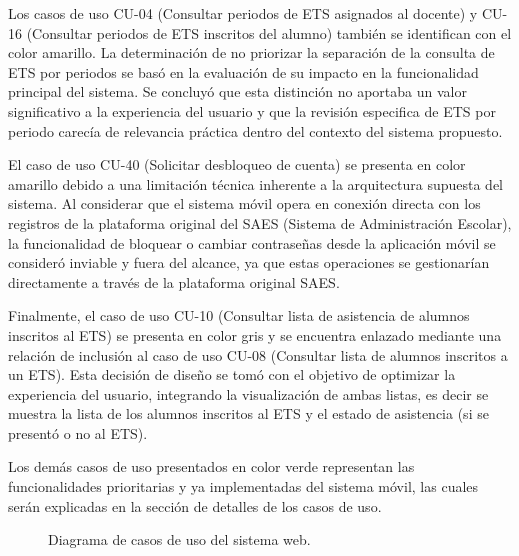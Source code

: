 Los casos de uso CU-04 (Consultar periodos de ETS asignados al docente) y CU-16 (Consultar periodos de ETS inscritos del alumno) también se identifican con el color amarillo. La determinación de no priorizar la separación de la consulta de ETS por periodos se basó en la evaluación de su impacto en la funcionalidad principal del sistema. Se concluyó que esta distinción no aportaba un valor significativo a la experiencia del usuario y que la revisión especifica de ETS por periodo carecía de relevancia práctica dentro del contexto del sistema propuesto.


El caso de uso CU-40 (Solicitar desbloqueo de cuenta) se presenta en color amarillo debido a una limitación técnica inherente a la arquitectura supuesta del sistema. Al considerar que el sistema móvil opera en conexión directa con los registros de la plataforma original del SAES (Sistema de Administración Escolar), la funcionalidad de bloquear o cambiar contraseñas desde la aplicación móvil se consideró inviable y fuera del alcance, ya que estas operaciones se gestionarían directamente a través de la plataforma original SAES.


Finalmente, el caso de uso CU-10 (Consultar lista de asistencia de alumnos inscritos al ETS) se presenta en color gris y se encuentra enlazado mediante una relación de inclusión al caso de uso CU-08 (Consultar lista de alumnos inscritos a un ETS). Esta decisión de diseño se tomó con el objetivo de optimizar la experiencia del usuario, integrando la visualización de ambas listas, es decir se muestra la lista de los alumnos inscritos al ETS y el estado de asistencia (si se presentó o no al ETS).


Los demás casos de uso presentados en color verde representan las funcionalidades prioritarias y ya implementadas del sistema móvil, las cuales serán explicadas en la sección de detalles de los casos de uso.


\newpage

\begin{figure}[htbp!]
	\begin{center}
		\caption{Diagrama de casos de uso del sistema web.}
		\label{fig:casosDeUso2}
	\end{center}
\end{figure}



